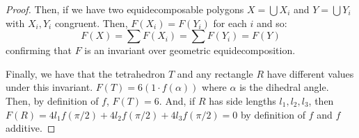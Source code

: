 \documentclass[12pt]{amsart}
\theoremstyle{definition}
\begin{document}
\begin{proof}
    Then, if we have two equidecomposable polygons $X = \bigcup X_i$ and $Y
    = \bigcup Y_i$ with $X_i, Y_i$ congruent. Then, $F(X_i) = F(Y_i)$ for
    each $i$ and so:
    $$F(X) = \sum F(X_i) = \sum F(Y_i) = F(Y)$$
    confirming that $F$ is an invariant over geometric equidecomposition.

    Finally, we have that the tetrahedron $T$ and any rectangle $R$ have
    different values under this invariant.
    $F(T) = 6(1\cdot f(\alpha))$ where $\alpha$ is the dihedral angle.
    Then, by definition of $f$, $F(T) = 6$.
    And, if $R$ has side lengths $l_1, l_2, l_3$, then $F(R) = 4 l_1
    f(\pi/2) + 4 l_2 f(\pi/2) + 4 l_3 f(\pi/2) = 0$ by definition of $f$
    and $f$ additive. 
\end{proof}
\end{document}

